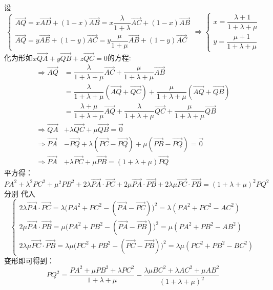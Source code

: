 \begin{solution}
      设\[
      \begin{cases}\overrightarrow{AQ}=x\overrightarrow{AD}+(1-x)\overrightarrow{AB}=x\dfrac{\lambda}{1+\lambda}\overrightarrow{AC}+(1-x)\overrightarrow{AB}\\[10pt]
      \overrightarrow{AQ}=y\overrightarrow{AE}+(1-y)\overrightarrow{AC}=y\dfrac{\mu}{1+\mu}\overrightarrow{AB}+(1-y)\overrightarrow{AC}\end{cases}\Rightarrow \begin{cases}x=\dfrac{\lambda+1}{1+\lambda+\mu}\\[8pt]y=\dfrac{\mu+1}{1+\lambda+\mu}\end{cases}
      \]
      化为形如$x\overrightarrow{QA}+y\overrightarrow{QB}+z\overrightarrow{QC}=0$的方程:
      \begin{align*}
          \Rightarrow \overrightarrow{AQ}&=\dfrac{\lambda}{1+\lambda+\mu}\overrightarrow{AC}+\dfrac{\mu}{1+\lambda+\mu}\overrightarrow{AB}\\
          &=\dfrac{\lambda}{1+\lambda+\mu}(\overrightarrow{AQ}+\overrightarrow{QC})+\dfrac{\mu}{1+\lambda+\mu}(\overrightarrow{AQ}+\overrightarrow{QB})\\
          &=\dfrac{\lambda+\mu}{1+\lambda+\mu}\overrightarrow{AQ}+\dfrac{\lambda}{1+\lambda+\mu}\overrightarrow{QC}+\dfrac{\mu}{1+\lambda+\mu}\overrightarrow{QB}\\
          \Rightarrow \overrightarrow{QA}&+\lambda\overrightarrow{QC}+\mu\overrightarrow{QB}=\vec{0}\\
          \Rightarrow \overrightarrow{PA}&-\overrightarrow{PQ}+\lambda(\overrightarrow{PC}-\overrightarrow{PQ})+\mu(\overrightarrow{PB}-\overrightarrow{PQ})=\vec{0}\\
          \Rightarrow \overrightarrow{PA}&+\lambda\overrightarrow{PC}+\mu\overrightarrow{PB}=(1+\lambda+\mu)\overrightarrow{PQ}
      \end{align*}
    平方得：\[
PA^2+\lambda^2PC^2+\mu^2PB^2+2\lambda\overrightarrow{PA}\cdot\overrightarrow{PC}+2\mu\overrightarrow{PA}\cdot\overrightarrow{PB}+2\lambda\mu\overrightarrow{PC}\cdot\overrightarrow{PB}=(1+\lambda+\mu)^2PQ^2\]分别
代入\[\begin{cases}2\lambda\overrightarrow{PA}\cdot\overrightarrow{PC}=\lambda\bigg(PA^2+PC^2-(\overrightarrow{PA}-\overrightarrow{PC})\bigg)^2=\lambda(PA^2+PC^2-AC^2)\\
    2\mu\overrightarrow{PA}\cdot\overrightarrow{PB}=\mu\bigg(PA^2+PB^2-(\overrightarrow{PA}-\overrightarrow{PB})\bigg)^2=\mu(PA^2+PB^2-AB^2)\\
    2\lambda\mu\overrightarrow{PC}\cdot\overrightarrow{PB}=\lambda\mu\bigg(PC^2+PB^2-(\overrightarrow{PC}-\overrightarrow{PB})\bigg)^2=\lambda\mu(PC^2+PB^2-BC^2)
\end{cases}\]
    变形即可得到：\[
    PQ^2=\dfrac{PA^2+\mu PB^2+\lambda PC^2}{1+\lambda+\mu}-\dfrac{\lambda\mu BC^2+\lambda AC^2+\mu AB^2}{\left(1+\lambda+\mu\right)^2}\]
\end{solution}
